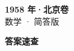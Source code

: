 \documentclass[zihao=-4, a4paper]{ctexart}
\begin{document}
\begin{center}
  {\Large\bfseries 1958 年·北京卷}\\[4pt]
  {\large 数学 · 简答版}
\end{center}
\medskip
{}

\clearpage
{}
\begin{center}{\Large\bfseries 答案速查}\end{center}
\medskip

\end{document}
